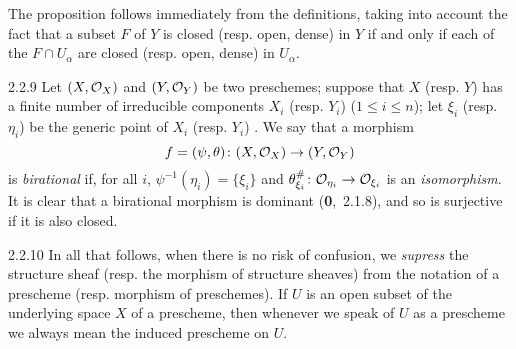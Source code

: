 \documentclass[../main.tex]{subfiles}
\begin{document}
The proposition follows immediately from the definitions, taking into
account the fact that a subset $F$ of $Y$ is closed (resp. open, dense) in $Y$
if and only if each of the $F\cap U_\alpha$ are closed (resp. open, dense) in
$U_\alpha$.

\begin{env}{2.2.9}
Let $(X,\mathcal{O}_X)$ and $(Y,\mathcal{O}_Y)$ be two preschemes; suppose that
$X$ (resp. $Y$) has a finite number of irreducible components $X_i$ (resp.
$Y_i$) ($1\leqslant i\leqslant n$); let $\xi_i$ (resp. $\eta_i$) be the generic
point of $X_i$ (resp. $Y_i$) . We say that a morphism
\[
  f=(\psi,\theta)\colon(X,\mathcal{O}_X)\to(Y,\mathcal{O}_Y)
\]
is \emph{birational}
if, for all $i$, $\psi^{-1}(\eta_i)=\{\xi_i\}$ and
$\theta_{\xi_i}^\#\colon\mathcal{O}_{\eta_i}\to\mathcal{O}_{\xi_i}$ is an \emph{isomorphism}. It
is clear that a birational morphism is dominant (\textbf{0},~2.1.8), and so is
surjective if it is also closed.
\end{env}

\begin{env}{2.2.10}
In all that follows, when there is
no risk of confusion, we \emph{supress} the structure sheaf (resp. the morphism
of structure sheaves) from the notation of a prescheme (resp. morphism of
preschemes). If $U$ is an open subset of the underlying space $X$ of a
prescheme, then whenever we speak of $U$ as a prescheme we always mean the
induced prescheme on $U$.
\end{env}
\end{document}
